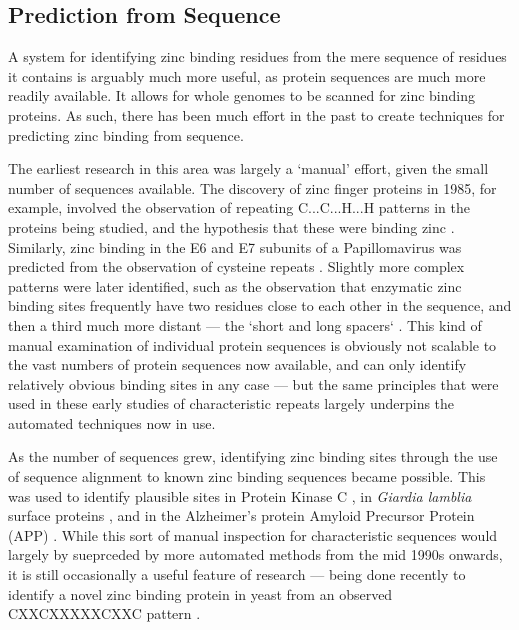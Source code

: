 \subsection{Prediction from Sequence}

A system for identifying zinc binding residues from the mere sequence of residues it contains is arguably much more useful, as protein sequences are much more readily available. It allows for whole genomes to be scanned for zinc binding proteins. As such, there has been much effort in the past to create techniques for predicting zinc binding from sequence.

The earliest research in this area was largely a `manual' effort, given the small number of sequences available. The discovery of zinc finger proteins in 1985, for example, involved the observation of repeating C...C...H...H patterns in the proteins being studied, and the hypothesis that these were binding zinc \cite{miller1985repetitive}. Similarly, zinc binding in the E6 and E7 subunits of a Papillomavirus was predicted from the observation of cysteine repeats \cite{barbosa1989papillomavirus}. Slightly more complex patterns were later identified, such as the observation that enzymatic zinc binding sites frequently have two residues close to each other in the sequence, and then a third much more distant --- the `short and long spacers` \cite{vallee1989short}. This kind of manual examination of individual protein sequences is obviously not scalable to the vast numbers of protein sequences now available, and can only identify relatively obvious binding sites in any case --- but the same principles that were used in these early studies of characteristic repeats largely underpins the automated techniques now in use.

As the number of sequences grew, identifying zinc binding sites through the use of sequence alignment to known zinc binding sequences became possible. This was used to identify plausible sites in Protein Kinase C \cite{bishop1991identification}, in {\it Giardia lamblia} surface proteins \cite{nash1993variant}, and in the Alzheimer's protein Amyloid Precursor Protein (APP) \cite{bush1993novel}. While this sort of manual inspection for characteristic sequences would largely by sueprceded by more automated methods from the mid 1990s onwards, it is still occasionally a useful feature of research --- being done recently to identify a novel zinc binding protein in yeast from an observed CXXCXXXXXCXXC pattern \cite{furukawa2018identification}.


